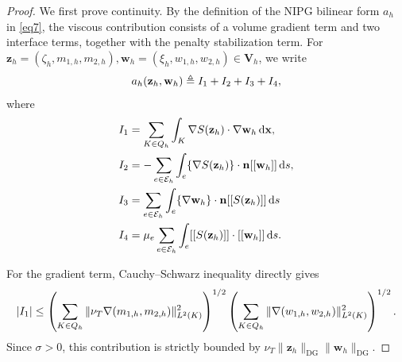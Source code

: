 \documentclass[pdflatex,sn-mathphys-num]{sn-jnl}%
\theoremstyle{thmstyleone}%
\theoremstyle{thmstyletwo}%
\theoremstyle{thmstylethree}%
\begin{document}
\begin{proof}
We first prove continuity. By the definition of the NIPG bilinear form $a_h$ in \eqref{eq7}, the viscous contribution consists of a volume gradient term and two interface terms, together with the penalty stabilization term. For $\mathbf{z}_h=(\zeta_h,m_{1,h},m_{2,h}),\mathbf{w}_h=(\xi_{h},w_{1,h},w_{2,h}) \in \mathbf V_h$, we write
\begin{equation}\notag
\begin{aligned}
a_h(\mathbf{z}_h,\mathbf{w}_h) \triangleq
I_1+I_2+I_3+I_4,
\end{aligned}
\end{equation}
where
\begin{equation}\notag
\begin{aligned}
I_1 &= \sum_{K \in Q_h}\int_K \nabla S(\mathbf{z}_h)\cdot \nabla\mathbf{w}_h\,\mathrm{d} \mathbf{x},
\\
I_2 &= -\sum_{e \in \mathcal{E}_h}\int_{e}\{\nabla S(\mathbf{z}_h)\} \cdot \mathbf{n}[[\mathbf{w}_h]]\,\mathrm{d}s,\\
I_3 &=
 \sum_{e \in \mathcal{E}_h}\int_{e}\{\nabla\mathbf{w}_h\} \cdot \mathbf{n}[[S(\mathbf{z}_h)]]\,\mathrm{d} s \\
 I_4 &= \mu_e \sum_{e \in \mathcal{E}_h} \int_{e}[[S(\mathbf{z}_h)]] \cdot [[\mathbf{w}_h]]\,\mathrm{d}s.
\end{aligned}
\end{equation}

For the gradient term, Cauchy--Schwarz inequality directly gives
\begin{equation}\notag
|I_1|
\le
\left(
\sum_{K\in Q_h}\|\nu_T\nabla (m_{1,h},m_{2,h})\|_{L^2(K)}^2
\right)^{1/2}
\left(
\sum_{K\in Q_h}\|\nabla (w_{1,h},w_{2,h})\|_{L^2(K)}^2
\right)^{1/2}.
\end{equation}
Since $\sigma>0$, this contribution is strictly bounded by $\nu_T\|\mathbf{z}_h\|_{\mathrm{DG}}\|\mathbf{w}_h\|_{\mathrm{DG}}$.


\end{proof}
\end{document}
